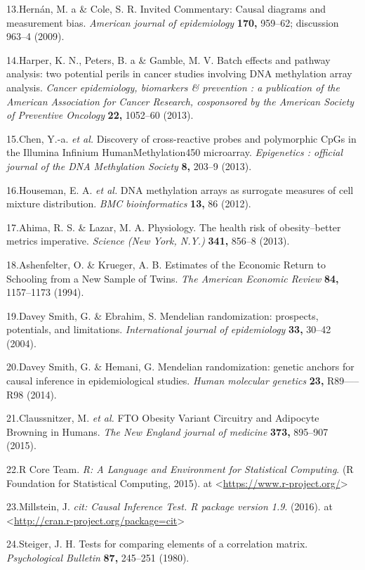 \documentclass[]{article}
\begin{document}
13.Hern{á}n, M. a \& Cole, S. R. Invited Commentary: Causal diagrams and
measurement bias. \emph{American journal of epidemiology} \textbf{170,}
959--62; discussion 963--4 (2009).

14.Harper, K. N., Peters, B. a \& Gamble, M. V. Batch effects and
pathway analysis: two potential perils in cancer studies involving DNA
methylation array analysis. \emph{Cancer epidemiology, biomarkers \&
prevention : a publication of the American Association for Cancer
Research, cosponsored by the American Society of Preventive Oncology}
\textbf{22,} 1052--60 (2013).

15.Chen, Y.-a. \emph{et al.} Discovery of cross-reactive probes and
polymorphic CpGs in the Illumina Infinium HumanMethylation450
microarray. \emph{Epigenetics : official journal of the DNA Methylation
Society} \textbf{8,} 203--9 (2013).

16.Houseman, E. A. \emph{et al.} DNA methylation arrays as surrogate
measures of cell mixture distribution. \emph{BMC bioinformatics}
\textbf{13,} 86 (2012).

17.Ahima, R. S. \& Lazar, M. A. Physiology. The health risk of
obesity--better metrics imperative. \emph{Science (New York, N.Y.)}
\textbf{341,} 856--8 (2013).

18.Ashenfelter, O. \& Krueger, A. B. Estimates of the Economic Return to
Schooling from a New Sample of Twins. \emph{The American Economic
Review} \textbf{84,} 1157--1173 (1994).

19.{Davey Smith}, G. \& Ebrahim, S. Mendelian randomization: prospects,
potentials, and limitations. \emph{International journal of
epidemiology} \textbf{33,} 30--42 (2004).

20.{Davey Smith}, G. \& Hemani, G. Mendelian randomization: genetic
anchors for causal inference in epidemiological studies. \emph{Human
molecular genetics} \textbf{23,} R89-----R98 (2014).

21.Claussnitzer, M. \emph{et al.} FTO Obesity Variant Circuitry and
Adipocyte Browning in Humans. \emph{The New England journal of medicine}
\textbf{373,} 895--907 (2015).

22.R Core Team. \emph{R: A Language and Environment for Statistical
Computing}. (R Foundation for Statistical Computing, 2015). at
\textless{}\url{https://www.r-project.org/}\textgreater{}

23.Millstein, J. \emph{cit: Causal Inference Test. R package version
1.9}. (2016). at
\textless{}\url{http://cran.r-project.org/package=cit}\textgreater{}

24.Steiger, J. H. Tests for comparing elements of a correlation matrix.
\emph{Psychological Bulletin} \textbf{87,} 245--251 (1980).
\end{document}
